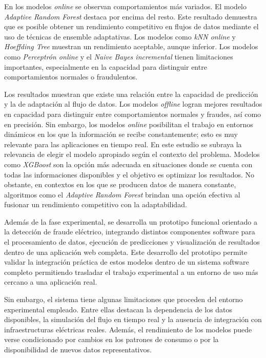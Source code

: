 \documentclass[12pt,a4paper]{report}
\begin{document}
En los modelos \emph{online} se observan comportamientos más variados. El modelo \emph{Adaptive Random Forest} destaca por encima del resto. Este resultado demuestra que es posible obtener un rendimiento competitivo en flujos de datos mediante el uso de técnicas de ensemble adaptativas. Los modelos como \emph{kNN online} y \emph{Hoeffding Tree} muestran un rendimiento aceptable, aunque inferior. Los modelos como \emph{Perceptrón online} y el \emph{Naive Bayes incremental} tienen limitaciones importantes, especialmente en la capacidad para distinguir entre comportamientos normales o fraudulentos.

Los resultados muestran que existe una relación entre la capacidad de predicción y la de adaptación al flujo de datos. Los modelos \emph{offline} logran mejores resultados en capacidad para distinguir entre comportamientos normales y fraudes, así como en precisión. Sin embargo, los modelos \emph{online} posibilitan el trabajo en entornos dinámicos en los que la información se recibe constantemente; esto es muy relevante para las aplicaciones en tiempo real. En este estudio se subraya la relevancia de elegir el modelo apropiado según el contexto del problema. Modelos como \emph{XGBoost} son la opción más adecuada en situaciones donde se cuenta con todas las informaciones disponibles y el objetivo es optimizar los resultados. No obstante, en contextos en los que se producen datos de manera constante, algoritmos como el \emph{Adaptive Random Forest} brindan una opción efectiva al fusionar un rendimiento competitivo con la adaptabilidad.

Además de la fase experimental, se desarrolla un prototipo funcional orientado a la detección de fraude eléctrico, integrando distintos componentes software para el procesamiento de datos, ejecución de predicciones y visualización de resultados dentro de una aplicación web completa. Este desarrollo del prototipo permite validar la integración práctica de estos modelos dentro de un sistema software completo permitiendo trasladar el trabajo experimental a un entorno de uso más cercano a una aplicación real.

Sin embargo, el sistema tiene algunas limitaciones que proceden del entorno experimental empleado. Entre ellas destacan la dependencia de los datos disponibles, la simulación del flujo en tiempo real y la ausencia de integración con infraestructuras eléctricas reales. Además, el rendimiento de los modelos puede verse condicionado por cambios en los patrones de consumo o por la disponibilidad de nuevos datos representativos.
\end{document}
